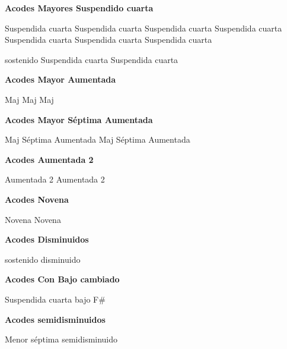 \vskip 20pt
\textbf{Acodes Mayores Suspendido cuarta}
\vskip 25pt

\small
{} Suspendida cuarta
 Suspendida cuarta
 Suspendida cuarta
 Suspendida cuarta
 Suspendida cuarta
 Suspendida cuarta
 Suspendida cuarta

 sostenido Suspendida cuarta
 Suspendida cuarta
\normalsize

\vskip 20pt
\textbf{Acodes Mayor Aumentada}
\vskip 25pt

\small
{} Maj
 Maj
 Maj
\normalsize

\vskip 20pt
\textbf{Acodes Mayor S\'eptima Aumentada}
\vskip 25pt

\small
{} Maj S\'eptima Aumentada
 Maj S\'eptima Aumentada
\normalsize

\vskip 20pt
\textbf{Acodes Aumentada 2}
\vskip 25pt

\small
{} Aumentada 2
 Aumentada 2
\normalsize

\vskip 20pt
\textbf{Acodes Novena}
\vskip 25pt

\small
{} Novena
 Novena
\normalsize

\vskip 20pt
\textbf{Acodes Disminuidos}
\vskip 25pt

\small
{} sostenido disminuido
\normalsize


\vskip 20pt
\textbf{Acodes Con Bajo cambiado}

\small
{}
\vskip 20pt
\vskip 20pt
\vskip 20pt
\vskip 20pt
 Suspendida cuarta bajo F\#
\normalsize

\vskip 20pt
\textbf{Acodes semidisminuidos}

\small
{} Menor s\'eptima semidisminuido
\normalsize


